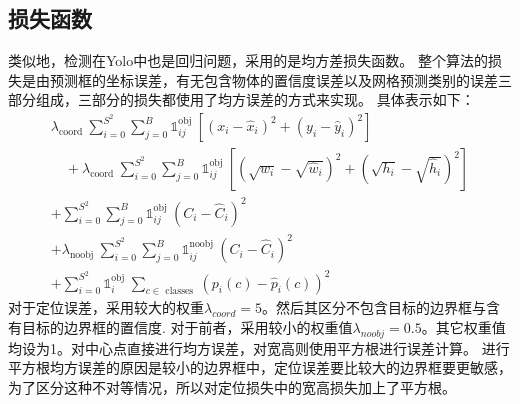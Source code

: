 \subsection{损失函数}
\par
类似地，检测在Yolo中也是回归问题，采用的是均方差损失函数。
整个算法的损失是由预测框的坐标误差，有无包含物体的置信度误差以及网格预测类别的误差三部分组成，三部分的损失都使用了均方误差的方式来实现。
具体表示如下：
\begin{equation}
	\begin{array}{l}
	\lambda_{\text {coord }} \sum_{i=0}^{S^{2}} \sum_{j=0}^{B} \mathbb{1}_{i j}^{\text {obj }}\left[\left(x_{i}-\hat{x}_{i}\right)^{2}+\left(y_{i}-\hat{y}_{i}\right)^{2}\right] \\
	\quad+\lambda_{\text {coord }} \sum_{i=0}^{S^{2}} \sum_{j=0}^{B} \mathbb{1}_{i j}^{\text {obj }}\left[\left(\sqrt{w_{i}}-\sqrt{\hat{w}_{i}}\right)^{2}+\left(\sqrt{h_{i}}-\sqrt{\hat{h}_{i}}\right)^{2}\right] \\
	+\sum_{i=0}^{S^{2}} \sum_{j=0}^{B} \mathbb{1}_{i j}^{\text {obj }}\left(C_{i}-\hat{C}_{i}\right)^{2} \\
	+\lambda_{\text {noobj }} \sum_{i=0}^{S^{2}} \sum_{j=0}^{B} \mathbb{1}_{i j}^{\text {noobj }}\left(C_{i}-\hat{C}_{i}\right)^{2} \\
	+\sum_{i=0}^{S^{2}} \mathbb{1}_{i}^{\text {obj }} \sum_{c \in \text { classes }}\left(p_{i}(c)-\hat{p}_{i}(c)\right)^{2}
	\end{array}
	\end{equation}
对于定位误差，采用较大的权重$\lambda_{coord}=5$。然后其区分不包含目标的边界框与含有目标的边界框的置信度.
对于前者，采用较小的权重值$\lambda_{noobj}=0.5$。其它权重值均设为1。对中心点直接进行均方误差，对宽高则使用平方根进行误差计算。
进行平方根均方误差的原因是较小的边界框中，定位误差要比较大的边界框要更敏感，为了区分这种不对等情况，所以对定位损失中的宽高损失加上了平方根。

